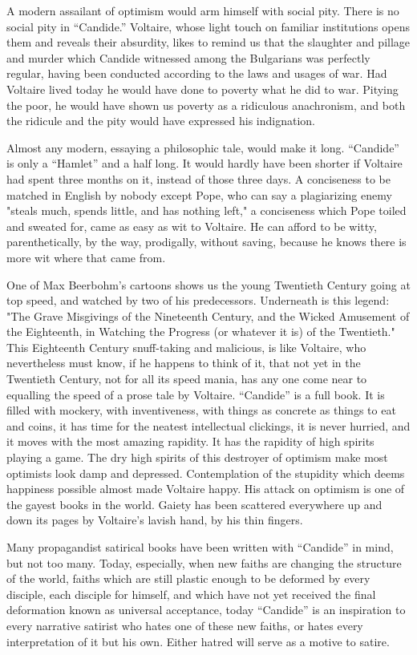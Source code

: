 A modern assailant of optimism would arm himself with social pity. There
is no social pity in ``Candide.'' Voltaire, whose light touch on familiar
institutions opens them and reveals their absurdity, likes to remind us
that the slaughter and pillage and murder which Candide witnessed among
the Bulgarians was perfectly regular, having been conducted according to
the laws and usages of war. Had Voltaire lived today he would have done
to poverty what he did to war. Pitying the poor, he would have shown us
poverty as a ridiculous anachronism, and both the ridicule and the pity
would have expressed his indignation.

Almost any modern, essaying a philosophic tale, would make it long.
``Candide'' is only a ``Hamlet'' and a half long. It would hardly have been
shorter if Voltaire had spent three months on it, instead of those three
days. A conciseness to be matched in English by nobody except Pope, who
can say a plagiarizing enemy "steals much, spends little, and has
nothing left," a conciseness which Pope toiled and sweated for, came as
easy as wit to Voltaire. He can afford to be witty, parenthetically, by
the way, prodigally, without saving, because he knows there is more wit
where that came from.

One of Max Beerbohm's cartoons shows us the young Twentieth Century
going at top speed, and watched by two of his predecessors. Underneath
is this legend: "The Grave Misgivings of the Nineteenth Century, and the
Wicked Amusement of the Eighteenth, in Watching the Progress (or
whatever it is) of the Twentieth." This Eighteenth Century snuff-taking
and malicious, is like Voltaire, who nevertheless must know, if he
happens to think of it, that not yet in the Twentieth Century, not for
all its speed mania, has any one come near to equalling the speed of a
prose tale by Voltaire. ``Candide'' is a full book. It is filled with
mockery, with inventiveness, with things as concrete as things to eat
and coins, it has time for the neatest intellectual clickings, it is
never hurried, and it moves with the most amazing rapidity. It has the
rapidity of high spirits playing a game. The dry high spirits of this
destroyer of optimism make most optimists look damp and depressed.
Contemplation of the stupidity which deems happiness possible almost
made Voltaire happy. His attack on optimism is one of the gayest books
in the world. Gaiety has been scattered everywhere up and down its pages
by Voltaire's lavish hand, by his thin fingers.

Many propagandist satirical books have been written with ``Candide'' in
mind, but not too many. Today, especially, when new faiths are changing
the structure of the world, faiths which are still plastic enough to be
deformed by every disciple, each disciple for himself, and which have
not yet received the final deformation known as universal acceptance,
today ``Candide'' is an inspiration to every narrative satirist who hates
one of these new faiths, or hates every interpretation of it but his
own. Either hatred will serve as a motive to satire.

